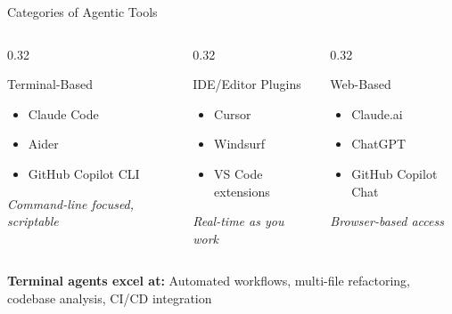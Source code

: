 \documentclass[aspectratio=169,11pt]{beamer}
\begin{document}
\begin{frame}{Categories of Agentic Tools}
    \begin{columns}[T]
        \begin{column}{0.32\textwidth}
            \begin{block}{Terminal-Based}
                \begin{itemize}
                    \item Claude Code
                    \item Aider
                    \item GitHub Copilot CLI
                \end{itemize}
                \vspace{0.2cm}
                \textit{Command-line focused, scriptable}
            \end{block}
        \end{column}
        \begin{column}{0.32\textwidth}
            \begin{block}{IDE/Editor Plugins}
                \begin{itemize}
                    \item Cursor
                    \item Windsurf
                    \item VS Code extensions
                \end{itemize}
                \vspace{0.2cm}
                \textit{Real-time as you work}
            \end{block}
        \end{column}
        \begin{column}{0.32\textwidth}
            \begin{block}{Web-Based}
                \begin{itemize}
                    \item Claude.ai
                    \item ChatGPT
                    \item GitHub Copilot Chat
                \end{itemize}
                \vspace{0.2cm}
                \textit{Browser-based access}
            \end{block}
        \end{column}
    \end{columns}

    \vspace{0.5cm}
    \textbf{Terminal agents excel at:} Automated workflows, multi-file refactoring, codebase analysis, CI/CD integration

\end{frame}
\end{document}
